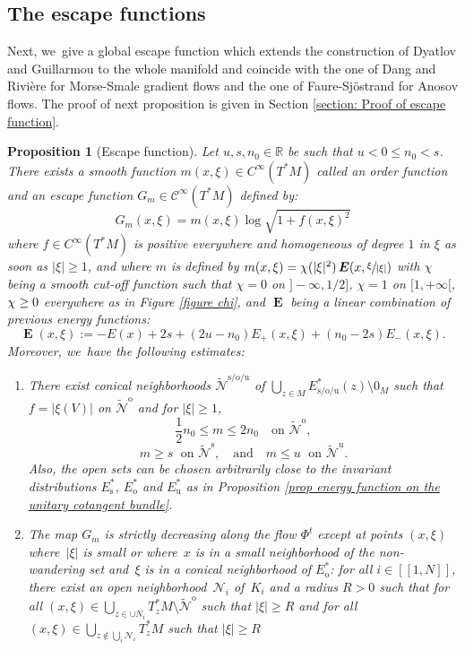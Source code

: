 \documentclass[11pt]{article}
\let\oldbigcup\bigcup
\newcommand{\lcr}{[\![}
\newcommand{\rcr}{]\!]}
\newcommand{\ro}{\mathrm{o}}
\newcommand{\rs}{\mathrm{s}}
\newcommand{\ru}{\mathrm{u}}
\theoremstyle{definition}
\theoremstyle{plain}
\newtheorem{prop}[definition]{Proposition}
\newcommand{\Ccal}{\mathcal{C}}
\newcommand{\Ncal}{\mathcal{N}}
\newcommand{\R}{\mathbb{R}}
\DeclareMathOperator{\E}{\boldsymbol{E}}
\begin{document}
\subsection{The escape functions}

Next, we~give a global escape function which extends the construction of Dyatlov and Guillarmou \cite{dyatlov-guillarmou_2016} to the whole manifold and coincide with the one of Dang and Rivière \cite{DR0} for Morse-Smale gradient flows and the one of Faure-Sjöstrand \cite{FS} for Anosov flows. The proof of next proposition is given in Section \ref{section: Proof of escape function}.

\begin{prop}[Escape function]\label{prop escape function}
Let $u,s,n_0 \in \R$ be such that $u < 0 \leq n_0 < s$. There exists a smooth function $m(x,\xi) \in C^{\infty} (T^* M)$ called an \emph{order function} and an \emph{escape function} $G_m \in \Ccal^{\infty} (T^*M)$ defined by:
\[
G_{m} (x, \xi) = m(x, \xi) \log \sqrt{1 + f(x,\xi)^2}
\]
where $f \in C^{\infty}(T^* M)$ is positive everywhere and homogeneous of degree $1$ in $\xi$ as soon as $|\xi| \geq 1$, and where $m$ is defined by $m(x,\xi) = \chi (|\xi|^2) \E(x,\sfrac{\xi}{|\xi|})$ with $\chi$ being a smooth cut-off function such that $\chi = 0$ on $]-\infty, 1/2]$, $\chi = 1$ on $[1,+\infty[$, $\chi \geq\nobreak 0$ everywhere as in Figure \ref{figure chi}, and $\E$ being a linear combination of previous energy functions:
\[
\E (x,\xi):= -E(x) + 2s + (2u - n_0) E_+ (x,\xi) + (n_0 - 2s) E_- (x,\xi).
\]
Moreover, we~have the following estimates:
\begin{enumerate}
\item\label{prop escape function1} There exist conical neighborhoods $\widetilde{\Ncal}^{\rs/\ro/\ru}$ of $\bigcup_{z \in M} E_{\rs/\ro/\ru}^* (z) \setminus 0_M$ such that $f = |\xi(V)|$ on $\widetilde{\Ncal}^\ro$ and for $|\xi| \geq 1$,
\[
\frac{1}{2} n_0 \leq m \leq 2n_0 \quad\text{on } \widetilde{\Ncal}^{\ro},
\]
\[
m \geq s \;\text{ on } \widetilde{\Ncal}^{\rs}, \quad \text{and} \quad m \leq u \;\text{ on } \widetilde{\Ncal}^{\ru}.
\]
Also, the open sets can be chosen arbitrarily close to the invariant distributions $E_\rs^*$, $E_\ro^*$ and $E_\ru^*$ as in Proposition \ref{prop energy function on the unitary cotangent bundle}.
\item\label{prop escape function2} The map $G_m$ is strictly decreasing along the flow $\Phi^t$ except at points $(x,\xi)$ where~$|\xi|$ is small or where~$x$ is in a small neighborhood of the non-wandering set and~$\xi$ is in a conical neighborhood of $E_\ro^*$: for all $i\in\lcr1,N\rcr$, there exist an open neighborhood~$\Ncal_i$ of~$K_i$ and a radius $R > 0$ such that for all $(x,\xi)\in \bigcup_{z\in \cup N_i} T_z^*M\setminus \widetilde{\Ncal}^\ro$ such that $ |\xi| \geq R$ \emph{and} for all $(x,\xi) \in \bigcup_{z\notin \oldbigcup_i \Ncal_i} T_z^*M$ such that $ |\xi| \geq R$

\end{enumerate}
\end{prop}
\end{document}
